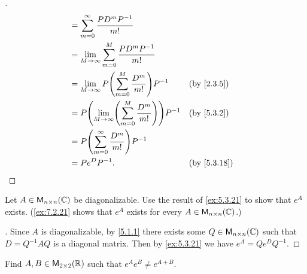 \begin{proof}[]
\begin{align*}
        & = \sum_{m = 0}^\infty \dfrac{P D^m P^{-1}}{m!}                                           \\
        & = \Lim_{M \to \infty} \sum_{m = 0}^M \dfrac{P D^m P^{-1}}{m!}                            \\
        & = \Lim_{M \to \infty} P \pa{\sum_{m = 0}^M \dfrac{D^m}{m!}} P^{-1}      &  & \by{2.3.5}  \\
        & = P \pa{\Lim_{M \to \infty} \pa{\sum_{m = 0}^M \dfrac{D^m}{m!}}} P^{-1} &  & \by{5.3.2}  \\
        & = P \pa{\sum_{m = 0}^\infty \dfrac{D^m}{m!}} P^{-1}                                      \\
        & = P e^D P^{-1}.                                                         &  & \by{5.3.18}
  \end{align*}
\end{proof}

\begin{ex}\label{ex:5.3.22}
  Let \(A \in \ms[n][n][\C]\) be diagonalizable.
  Use the result of \cref{ex:5.3.21} to show that \(e^A\) exists.
  (\cref{ex:7.2.21} shows that \(e^A\) exists for every \(A \in \ms[n][n][\C]\).)
\end{ex}

\begin{proof}[]
  Since \(A\) is diagonalizable, by \cref{5.1.1} there exists some \(Q \in \ms[n][n][\C]\) such that \(D = Q^{-1} A Q\) is a diagonal matrix.
  Then by \cref{ex:5.3.21} we have \(e^A = Q e^D Q^{-1}\).
\end{proof}

\begin{ex}\label{ex:5.3.23}
  Find \(A, B \in \ms[2][2][\R]\) such that \(e^A e^B \neq e^{A + B}\).
\end{ex}

